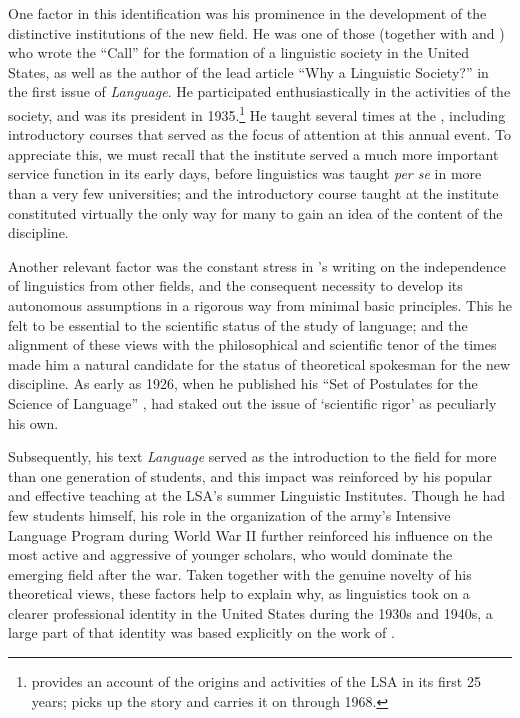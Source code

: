 One factor in this identification was his prominence in the
development of the distinctive institutions of the new field. He was
one of those (together with  and ) who
wrote the ``Call'' for the formation of a linguistic society in the
United States, as well as the author of the lead article ``Why a
Linguistic Society?'' \citep{bloomfield1925:why.lsa} in the first issue
of \textsl{Language}. He participated enthusiastically in the
activities of the society, and was its president in
1935.\footnote{\citet{murray91:lsa} provides an account of the origins
  and activities of the LSA in its first 25 years; \citet{hill91:lsa}
  picks up the story and carries it on through 1968.} He taught
several times at the , including introductory
courses that served as the focus of attention at this annual event. To
appreciate this, we must recall that the institute served a much more
important service function in its early days, before linguistics was
taught \emph{per se} in more than a very few universities; and the
introductory course taught at the institute constituted virtually the
only way for many to gain an idea of the content of the discipline.

Another relevant factor was the constant {stress} in {\Bloomfield}'s
writing on the independence of linguistics from other fields, and the
consequent necessity to develop its autonomous assumptions in a
rigorous way from minimal basic principles. This he felt to be
essential to the scientific status of the study of language; and the
alignment of these views with the philosophical and scientific tenor
of the times made him a natural candidate for the status of
theoretical spokesman for the new discipline. As early as 1926, when
he published his ``Set of Postulates for the Science of Language''
\citep{bloomfield26:postulates}, {\Bloomfield} had staked out the issue
of `scientific rigor' as peculiarly his own.

Subsequently, his text \textsl{Language} \citep{bloomfield:lg} served
as the introduction to the field for more than one generation of
students, and this impact was reinforced by his popular and effective
teaching at the LSA's summer Linguistic Institutes. Though he had few
students himself, his role in the organization of the army's Intensive
Language Program during World War II further reinforced his influence
on the most active and aggressive of younger scholars, who would
dominate the emerging field after the war. Taken together with the
genuine novelty of his theoretical views, these factors help to
explain why, as linguistics took on a clearer professional identity in
the United States during the 1930s and 1940s, a large part of that
identity was based explicitly on the work of {\Bloomfield}.

